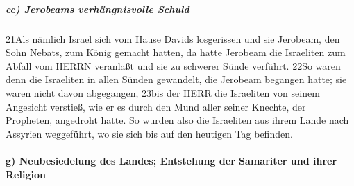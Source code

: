 \hypertarget{cc-jerobeams-verhuxe4ngnisvolle-schuld}{%
\subparagraph{cc) Jerobeams verhängnisvolle
Schuld}\label{cc-jerobeams-verhuxe4ngnisvolle-schuld}}

21Als nämlich Israel sich vom Hause Davids losgerissen und sie Jerobeam,
den Sohn Nebats, zum König gemacht hatten, da hatte Jerobeam die
Israeliten zum Abfall vom HERRN veranlaßt und sie zu schwerer Sünde
verführt. 22So waren denn die Israeliten in allen Sünden gewandelt, die
Jerobeam begangen hatte; sie waren nicht davon abgegangen, 23bis der
HERR die Israeliten von seinem Angesicht verstieß, wie er es durch den
Mund aller seiner Knechte, der Propheten, angedroht hatte. So wurden
also die Israeliten aus ihrem Lande nach Assyrien weggeführt, wo sie
sich bis auf den heutigen Tag befinden.

\hypertarget{g-neubesiedelung-des-landes-entstehung-der-samariter-und-ihrer-religion}{%
\paragraph{g) Neubesiedelung des Landes; Entstehung der Samariter und
ihrer
Religion}\label{g-neubesiedelung-des-landes-entstehung-der-samariter-und-ihrer-religion}}

